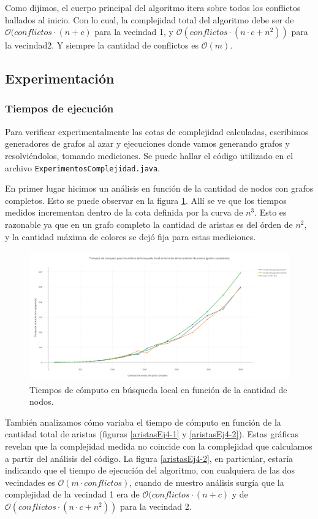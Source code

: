 Como dijimos, el cuerpo principal del algoritmo itera sobre todos los conflictos hallados al inicio. Con lo cual, la complejidad total del algoritmo debe ser de $\mathcal{O}(conflictos \cdot (n+c)$ para la vecindad 1, y $\mathcal{O}(conflictos \cdot (n \cdot c + n^2))$ para la vecindad2. Y siempre la cantidad de conflictos es $\mathcal{O}(m)$.

\subsection{Experimentación}

\subsubsection{Tiempos de ejecución}

Para verificar experimentalmente las cotas de complejidad calculadas, escribimos generadores de grafos al azar y ejecuciones donde vamos generando grafos y resolviéndolos, tomando mediciones. Se puede hallar el código utilizado en el archivo \texttt{ExperimentosComplejidad.java}.

En primer lugar hicimos un análisis en función de la cantidad de nodos con grafos completos. Esto se puede observar en la figura \ref{nodosEj4}. Allí se ve que los tiempos medidos incrementan dentro de la cota definida por la curva de $n^3$. Esto es razonable ya que en un grafo completo la cantidad de aristas es del órden de $n^2$, y la cantidad máxima de colores se dejó fija para estas mediciones.

\begin{figure}[]
	\centering
 	\includegraphics[width=18cm]{imagenes/Ej4/TvsNodos.png}
	\caption{Tiempos de cómputo en búsqueda local en función de la cantidad de nodos.}
	\label{nodosEj4}
 \end{figure}
 
También analizamos cómo variaba el tiempo de cómputo en función de la cantidad total de aristas (figuras \ref{aristasEj4-1} y \ref{aristasEj4-2}). Estas gráficas revelan que la complejidad medida no coincide con la complejidad que calculamos a partir del análisis del código. La figura \ref{aristasEj4-2}, en particular, estaría indicando que el tiempo de ejecución del algoritmo, con cualquiera de las dos vecindades es $\mathcal{O}(m \cdot conflictos)$, cuando de nuestro análisis surgía que la complejidad de la vecindad 1 era de $\mathcal{O}(conflictos \cdot (n+c)$  y de $\mathcal{O}(conflictos \cdot (n \cdot c + n^2))$ para la vecindad 2.

